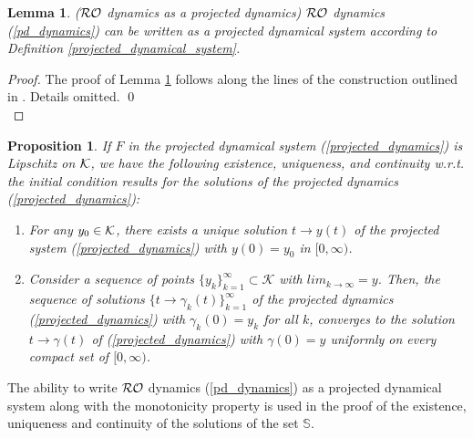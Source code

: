 \documentclass[journal,twoside,web]{ieeecolor}
\newtheorem{lemma}{Lemma}
\newtheorem{proposition}[theorem]{Proposition}
\begin{document}
\begin{lemma} \label{projected} (${\cal RO}$ dynamics as a projected dynamics)
${\cal RO}$ dynamics (\ref{pd_dynamics}) can be written as a projected dynamical system according to Definition \ref{projected_dynamical_system}.
\end{lemma}
\begin{proof}
The proof of Lemma \ref{projected} follows along the lines of the construction outlined in \cite{cherukuri2016}. Details omitted. \qed\\
\end{proof}

\begin{proposition} \label{proposition_projected}
If $F$ in the projected dynamical system (\ref{projected_dynamics}) is Lipschitz on ${\cal K}$, we have the following existence, uniqueness, and continuity w.r.t. the initial condition results for the solutions of the projected dynamics (\ref{projected_dynamics}):
\begin{enumerate}
\item For any $y_{0} \in {\cal K}$, there exists a unique solution $t \rightarrow y(t)$ of the projected system (\ref{projected_dynamics}) with $y(0)=y_{0}$ in $[0,\infty)$.
\item Consider a sequence of points $\{y_{k}\}_{k=1}^\infty \subset {\mathcal K}$ with $lim_{k \rightarrow \infty}=y$. Then, the sequence of solutions $\{t \rightarrow \gamma_k(t)\}_{k=1}^\infty$ of the projected dynamics (\ref{projected_dynamics}) with $\gamma_k(0)=y_k$ for all $k$, converges to the solution $t \rightarrow \gamma(t)$ of (\ref{projected_dynamics}) with $\gamma(0)=y$ uniformly on every compact set of $[0,\infty)$.
\end{enumerate}
\end{proposition}
The ability to write ${\cal RO}$ dynamics (\ref{pd_dynamics}) as a projected dynamical system along with the monotonicity property is used in the proof of the existence, uniqueness and continuity of the solutions of the set ${\mathbb S}$.
\end{document}

